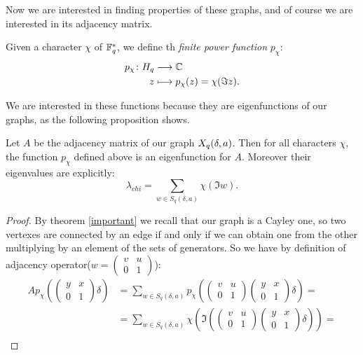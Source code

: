 Now we are interested in finding properties of these graphs, and of course we are interested in its adjacency matrix.
\begin{defn}
	Given a character $\chi$ of ${\mathbb F}_q^{*}$, we define th \emph{finite power function} $p_{\chi}$:
	\begin{align*}
		p_{\chi} \colon H_q & \longrightarrow {\mathbb C} \\
		z & \longmapsto p_{\chi}(z)=\chi (\Im z).
	\end{align*}
\end{defn}
We are interested in these functions because they are eigenfunctions of our graphs, as the following proposition shows.
\begin{prop}
Let $A$ be the adjacency matrix of our graph $X_q (\delta ,a)$. Then for all characters $\chi$, the function $p_{\chi}$
defined above is an eigenfunction for $A$. Moreover their eigenvalues are explicitly:
\begin{equation}\label{eigen}
	\lambda_{chi}=\sum_{w\in S_q(\delta,a)} \chi (\Im w).
\end{equation}
\begin{proof}
By theorem \ref{important} we recall that our graph is a Cayley one, so two vertexes are connected by an edge if and only if
we can obtain one from the other multiplying by an element of the sets of generators.
So we have by definition of adjacency operator($w = \begin{pmatrix} v & u \\ 0 & 1 \end{pmatrix}$):
\begin{align*}
	Ap_{\chi}(\begin{pmatrix} y & x \\ 0 & 1 \end{pmatrix} \delta) &=
	 \sum_{w \in S_q(\delta,a)} p_{\chi}(\begin{pmatrix} v & u \\ 0 & 1 \end{pmatrix}
	 \begin{pmatrix} y & x \\ 0 & 1 \end{pmatrix} \delta)=\\
	 &=\sum_{w \in S_q(\delta,a)} \chi (\Im (\begin{pmatrix} v & u \\ 0 & 1 \end{pmatrix}
	 \begin{pmatrix} y & x \\ 0 & 1 \end{pmatrix} \delta))=\\

\end{align*}
\end{proof}
\end{prop}
